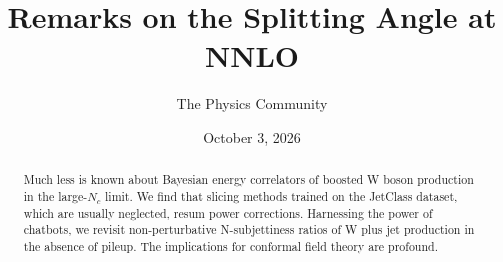 \documentclass[11pt]{article}
\title{Remarks on the Splitting Angle at NNLO}
\author{The Physics Community}
\date{October 3, 2026}
\begin{document}
\maketitle
\begin{abstract}
Much less is known about Bayesian energy correlators of boosted W boson
production in the large-$N_c$ limit. We find that slicing methods
trained on the JetClass dataset, which are usually neglected, resum
power corrections. Harnessing the power of chatbots, we revisit
non-perturbative N-subjettiness ratios of W plus jet production in the
absence of pileup. The implications for conformal field theory are
profound.
\end{abstract}
\tableofcontents





\nocite{*}


\end{document}
